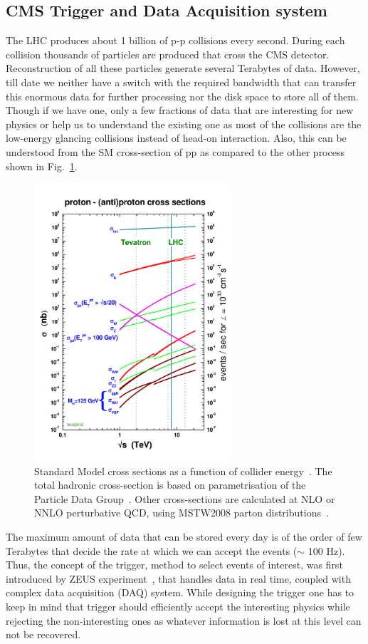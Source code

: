 \subsection{CMS Trigger and Data Acquisition system} %
\label{sub:cms_trigger_and_data_acquisition_system}
The LHC produces about 1 billion of p-p collisions every second.
During each collision thousands of particles are produced that cross the CMS detector.
Reconstruction of all these particles generate several Terabytes of data.
However, till date we neither have a switch with the required bandwidth that can transfer this enormous data for further processing nor the disk space to store all of them.
Though if we have one, only a few fractions of data that are interesting for new physics or help us to understand the existing one as most of the collisions are the low-energy glancing collisions instead of head-on interaction.
Also, this can be understood from the SM cross-section of pp as compared to the other process shown in Fig.~\ref{fig:SM-cross-section}.
\begin{figure}[!htbp]
	\centering
	\includegraphics[width=0.65\textwidth]{figures/LHC/crosssections2012_v5.pdf}
	\caption{Standard Model cross sections as a function of collider energy~\cite{Stirling2012}. The total hadronic cross-section is based on parametrisation of the Particle Data Group~\cite{PDG2018}. Other cross-sections are calculated at NLO or NNLO perturbative QCD, using MSTW2008 parton distributions~\cite{Martin2009}.}
	\label{fig:SM-cross-section}
\end{figure}
The maximum amount of data that can be stored every day is of the order of few Terabytes that decide the rate at which we can accept the events ($\sim$ 100 Hz).
Thus, the concept of the trigger, method to select events of interest, was first introduced by ZEUS experiment~\cite{ZEUSCollaboration1993}, that handles data in real time, coupled with complex data acquisition (DAQ) system.
While designing the trigger one has to keep in mind that trigger should efficiently accept the interesting {\color{red}physics while} rejecting the non-interesting ones as whatever information is lost at this level can not be recovered.

